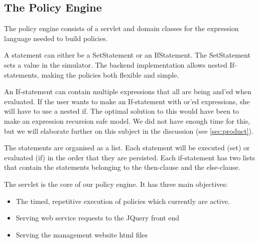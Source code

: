 \subsection{The Policy Engine}\label{subsec:policyengine}
The policy engine consists of a servlet and domain classes for the expression language needed to build policies. 

A statement can either be a SetStatement or an IfStatement. The SetStatement sets a value in the simulator. The backend implementation allows nested If-statements, making the policies both flexible and simple. 

An If-statement can contain multiple expressions that all are being and'ed when evaluated. If the user wants to make an If-statement with or'ed expressions, she will have to use a nested if. The optimal solution to this would have been to make an expression recursion safe model. We did not have enough time for this, but we will elaborate further on this subject in the discussion (see \ref{sec:product}). 

The statements are organised as a list. Each statement will be executed (set) or evaluated (if) in the order that they are persisted. Each if-statement has two lists that contain the statements belonging to the then-clause and the else-clause.

The servlet is the core of our policy engine. It has three main objectives:

\begin{figure}[b]
\end{figure}

\begin{itemize}
	\item The timed, repetitive execution of policies which currently are active.
	\item Serving web service requests to the JQuery front end
	\item Serving the management website html files
\end{itemize}

